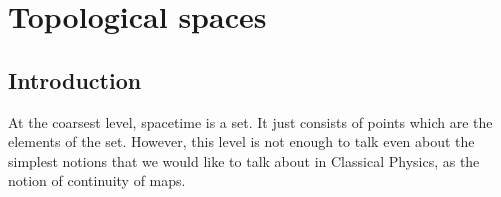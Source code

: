 %


\chapter{Topological spaces}

\section{Introduction}
At the coarsest level, spacetime is a set. It just consists of points which are the
elements of the set. However, this level is not enough to talk even about the simplest
notions that we would like to talk about in Classical Physics, as the notion of
continuity of maps.

